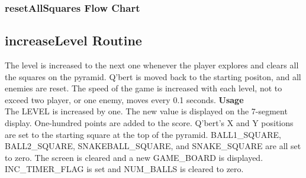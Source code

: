   \subsubsection{resetAllSquares Flow Chart}
  \begin{center}
  \end{center}

\newpage
  \subsection{increaseLevel Routine}
   \indent
    The level is increased to the next one whenever the player explores and
    clears all the squares on the pyramid. Q'bert is moved back to the starting
    positon, and all enemies are reset. The speed of the game is increased with each
    level, not to exceed two player, or one enemy, moves every 0.1 seconds.   
   \vskip 8pt
   \noindent
   {\bf Usage }\\
     The LEVEL is increased by one. The new value is displayed on the 7-segment
     display. One-hundred points are added to the score. Q'bert's X and Y positions
     are set to the starting square at the top of the pyramid. BALL1\_SQUARE, 
     BALL2\_SQUARE, SNAKEBALL\_SQUARE, and SNAKE\_SQUARE are all set to zero.
     The screen is cleared and a new GAME\_BOARD is displayed. INC\_TIMER\_FLAG is
     set and NUM\_BALLS is cleared to zero. 
 \vskip 8pt
  \noindent

